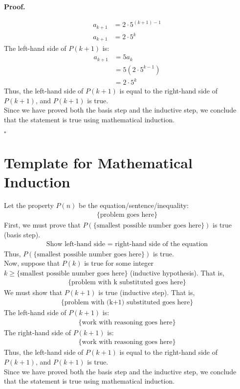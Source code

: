 \documentclass{article}
\newenvironment{proof}{
    \begin{mdframed}[nobreak=true, innerleftmargin=10pt, innerrightmargin=10pt, innertopmargin=10pt, innerbottommargin=10pt]
    \textbf{Proof.}
}{
    \hfill $\square$
    \end{mdframed}
}
\begin{document}
\begin{proof}
\begin{enumerate}
                    \begin{align*}
                        a_{k+1} &= 2 \cdot 5^{(k+1)-1} \\
                        a_{k+1} &= 2 \cdot 5^k
                    \end{align*}
                    The left-hand side of $P(k+1)$ is:
                    \begin{align*}
                        a_{k+1} &= 5a_k \\
                        &= 5(2 \cdot 5^{k-1}) \\
                        &= 2 \cdot 5^k
                    \end{align*}
                    Thus, the left-hand side of $P(k+1)$ is equal to the right-hand side of $P(k+1)$, and $P(k+1)$ is true. \\
                    Since we have proved both the basis step and the inductive step, we conclude that the statement is true using mathematical induction.
            \end{enumerate}
        \end{proof}
        

\newpage \section{Template for Mathematical Induction}
    Let the property $P(n)$ be the equation/sentence/inequality:
    \begin{align*}
        \text{\{problem goes here\}}
    \end{align*}
    First, we must prove that $P(\text{\{smallest possible number goes here\}})$ is true (basis step).
    \begin{align*}
        \text{Show left-hand side = right-hand side of the equation}
    \end{align*}
    Thus, $P(\text{\{smallest possible number goes here\}})$ is true. \\
    Now, suppose that $P(k)$ is true for some integer $k \geq \text{\{smallest possible number goes here\}}$ (inductive hypothesis). That is, 
    \begin{align*}
        \text{\{problem with k substituted goes here\}}
    \end{align*}
    We must show that $P(k+1)$ is true (inductive step). That is, 
    \begin{align*}
        \text{\{problem with (k+1) substituted goes here\}}
    \end{align*}
    The left-hand side of $P(k+1)$ is:
    \begin{align*}
        \text{\{work with reasoning goes here\}}
    \end{align*}
    The right-hand side of $P(k+1)$ is:
    \begin{align*}
        \text{\{work with reasoning goes here\}}
    \end{align*}
    Thus, the left-hand side of $P(k+1)$ is equal to the right-hand side of $P(k+1)$, and $P(k+1)$ is true. \\
    Since we have proved both the basis step and the inductive step, we conclude that the statement is true using mathematical induction.
\end{document}
